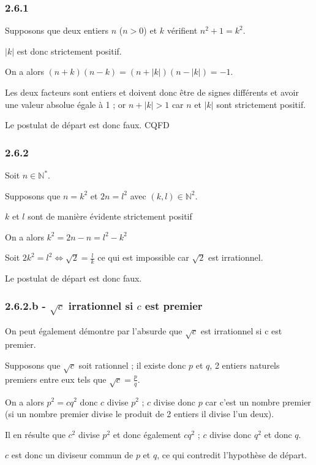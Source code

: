 \documentclass[a4paper,10pt]{report}
\begin{document}
\subsubsection*{2.6.1}

Supposons que deux entiers $n$ ($n>0$) et $k$ vérifient $n^2 + 1 = k^2$.

$|k|$ est donc strictement positif.

On a alors $(n+k)(n-k) = (n+|k|)(n-|k|)= -1$.

Les deux facteurs sont entiers et doivent donc être de signes différents et avoir une 
valeur absolue égale à 1 ; or $n+|k| >1$ car $n$ et $|k|$ sont strictement positif.

Le postulat de départ est donc faux. CQFD



\subsubsection*{2.6.2}

Soit $n \in \mathbb{N}^*$.

Supposons que $n = k^2$ et $2n = l^2$ avec $(k,l) \in \mathbb{N}^2$.

$k$ et $l$ sont de manière évidente strictement positif

On a alors $k^2 = 2n - n = l^2 -k^2$

Soit $2k^2 = l^2 \Longleftrightarrow  \sqrt{2} = \frac{l}{k} $ ce qui est impossible car $\sqrt{2}$ est irrationnel.

Le postulat de départ est donc faux.

\subsubsection*{2.6.2.b - $\sqrt{c}$ irrationnel si $c$ est premier}

On peut également démontre par l'absurde que $\sqrt{c}$ est irrationnel si c est premier.

Supposons que $\sqrt{c}$ soit rationnel ; il existe donc $p$ et $q$, 2 entiers naturels premiers entre eux tels que
$\sqrt{c}= \frac{p}{q}$.

On a alors $p^2 = cq^2$ donc $c$ divise $p^2$ ; $c$ divise donc $p$ car c'est un nombre premier (si un nombre premier
divise le produit de 2 entiers il divise l'un deux).

Il en résulte que $c^2$ divise $p^2$ et donc également $cq^2$ ; $c$ divise donc $q^2$ et donc $q$.

$c$ est donc un diviseur commun de $p$ et $q$, ce qui contredit l'hypothèse de départ.
\end{document}
